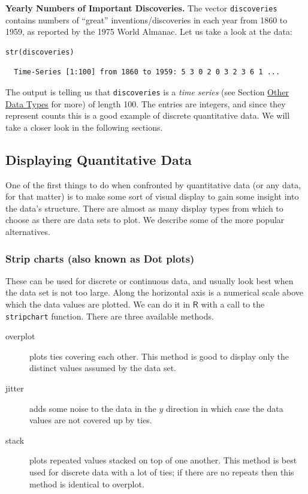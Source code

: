 \documentclass[captions=tableheading]{scrbook}
\begin{document}
\begin{example}
\textbf{Yearly Numbers of Important Discoveries.} The vector \texttt{discoveries} contains numbers of “great” inventions/discoveries in each year from 1860 to 1959, as reported by the 1975 World Almanac. Let us take a look at the data:


\begin{verbatim}
str(discoveries)
\end{verbatim}

\begin{verbatim}
  Time-Series [1:100] from 1860 to 1959: 5 3 0 2 0 3 2 3 6 1 ...
\end{verbatim}

\end{example}

The output is telling us that \texttt{discoveries} is a \emph{time series} (see Section \href{file://~/outputlatexdata-description}{Other Data Types} for more) of length 100. The entries are integers, and since they represent counts this is a good example of discrete quantitative data. We will take a closer look in the following sections.
\subsection{Displaying Quantitative Data}
\label{sec-3-1-2}
\label{sub-Displaying-Quantitative-Data}


One of the first things to do when confronted by quantitative data (or any data, for that matter) is to make some sort of visual display to gain some insight into the data's structure. There are almost as many display types from which to choose as there are data sets to plot. We describe some of the more popular alternatives. 
\subsubsection{Strip charts (also known as Dot plots)}
\label{sec-3-1-2-1}
\label{par:Strip-charts}


These can be used for discrete or continuous data, and usually look best when the data set is not too large. Along the horizontal axis is a numerical scale above which the data values are plotted. We can do it in \(\mathsf{R}\) with a call to the \texttt{stripchart} function. There are three available methods.

\begin{description}
\item[overplot] plots ties covering each other. This method is good to display only the distinct values assumed by the data set.
\item[jitter] adds some noise to the data in the \(y\) direction in which case the data values are not covered up by ties.
\item[stack] plots repeated values stacked on top of one another. This method is best used for discrete data with a lot of ties; if there are no repeats then this method is identical to overplot.
\end{description}
\end{document}
